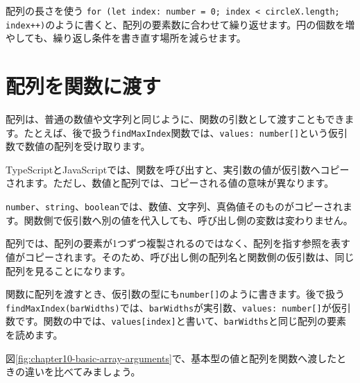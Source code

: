 \begin{notebox}{配列の長さを使う}
\texttt{for (let index: number = 0; index < circleX.length; index++)}のように書くと、配列の要素数に合わせて繰り返せます。円の個数を増やしても、繰り返し条件を書き直す場所を減らせます。
\end{notebox}

\section{配列を関数に渡す}

配列は、普通の数値や文字列と同じように、関数の引数として渡すこともできます。たとえば、後で扱う\texttt{findMaxIndex}関数では、\texttt{values: number[]}という仮引数で数値の配列を受け取ります。

TypeScriptとJavaScriptでは、関数を呼び出すと、実引数の値が仮引数へコピーされます。ただし、数値と配列では、コピーされる値の意味が異なります。

\texttt{number}、\texttt{string}、\texttt{boolean}では、数値、文字列、真偽値そのものがコピーされます。関数側で仮引数へ別の値を代入しても、呼び出し側の変数は変わりません。

配列では、配列の要素が1つずつ複製されるのではなく、配列を指す参照を表す値がコピーされます。そのため、呼び出し側の配列名と関数側の仮引数は、同じ配列を見ることになります。

関数に配列を渡すとき、仮引数の型にも\texttt{number[]}のように書きます。後で扱う\texttt{findMaxIndex(barWidths)}では、\texttt{barWidths}が実引数、\texttt{values: number[]}が仮引数です。関数の中では、\texttt{values[index]}と書いて、\texttt{barWidths}と同じ配列の要素を読めます。

図\ref{fig:chapter10-basic-array-arguments}で、基本型の値と配列を関数へ渡したときの違いを比べてみましょう。

